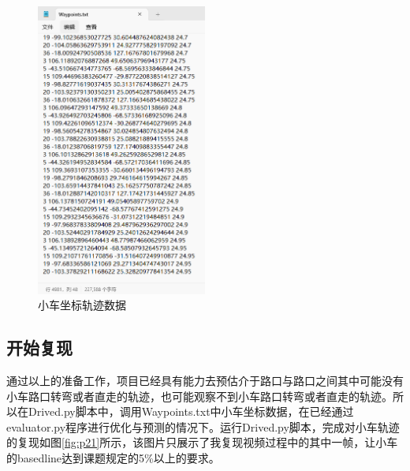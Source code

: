\begin{figure}[htbp] %
	\centering
	\includegraphics[width=0.5\textwidth]{p20} %
	\caption{小车坐标轨迹数据} %
	\label{fig:p20} %
\end{figure}









\subsection{开始复现}

通过以上的准备工作，项目已经具有能力去预估介于路口与路口之间其中可能没有小车路口转弯或者直走的轨迹，也可能观察不到小车路口转弯或者直走的轨迹。所以在Drived.py脚本中，调用Waypoints.txt中小车坐标数据，在已经通过evaluator.py程序进行优化与预测的情况下。运行Drived.py脚本，完成对小车轨迹的复现如图\ref{fig:p21}所示，该图片只展示了我复现视频过程中的其中一帧，让小车的basedline达到课题规定的5\%以上的要求。



